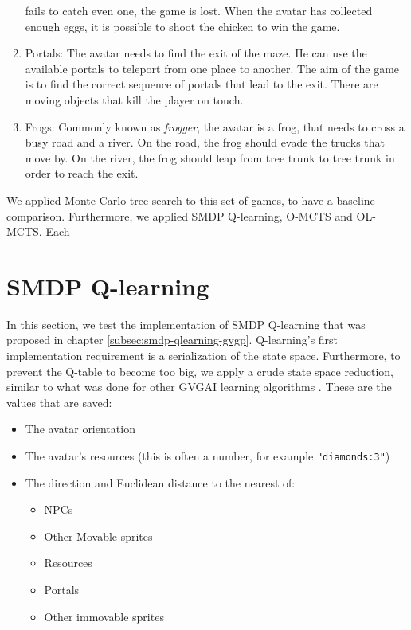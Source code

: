 \begin{enumerate}
		fails to catch even one, the game is lost. When the avatar
		has collected enough eggs, it is possible to shoot the chicken to win
		the game.
	\item Portals:
		The avatar needs to find the exit of the maze. He can use the available
		portals to teleport from one place to another. The aim of the game is to
		find the correct sequence of portals that lead to the exit. There are
		moving objects that kill the player on touch.
	\item Frogs:
		Commonly known as \textit{frogger}, the avatar is a frog, that needs to
		cross a busy road and a river. On the road, the frog should evade the
		trucks that move by. On the river, the frog should leap from tree trunk
		to tree trunk in order to reach the exit.
\end{enumerate}

We applied Monte Carlo tree search to this set of games, to have a baseline
comparison. Furthermore, we applied SMDP Q-learning, O-MCTS and OL-MCTS. Each 

\section{SMDP Q-learning}
In this section, we test the implementation of SMDP Q-learning that was proposed
in chapter \ref{subsec:smdp-qlearning-gvgp}. Q-learning's first implementation requirement is
a serialization of the state space.  Furthermore, to prevent the Q-table to
become too big, we apply a crude state space reduction, similar to what was done
for other GVGAI learning algorithms \cite{samothrakis2015neuroevolution}.  These
are the values that are saved:

\begin{itemize}
	\item The avatar orientation
	\item The avatar's resources (this is often a number, for example
		\texttt{"diamonds:3"})
	\item The direction and Euclidean distance to the nearest of:
		\begin{itemize}
			\item NPCs
			\item Other Movable sprites
			\item Resources
			\item Portals
			\item Other immovable sprites
		\end{itemize}
\end{itemize}

